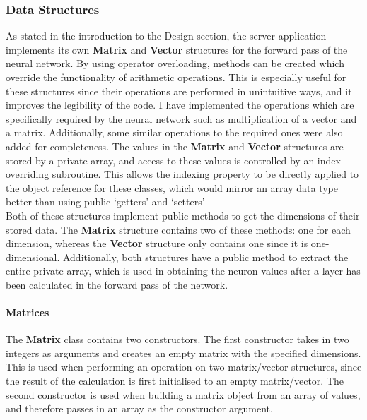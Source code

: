 \documentclass{article}
\begin{document}
\subsubsection{Data Structures}

As stated in the introduction to the Design section, the server application implements its own \textbf{Matrix} and \textbf{Vector} structures for the forward pass of the neural network. By using operator overloading, methods can be created which override the functionality of arithmetic operations. This is especially useful for these structures since their operations are performed in unintuitive ways, and it improves the legibility of the code. I have implemented the operations which are specifically required by the neural network such as multiplication of a vector and a matrix. Additionally, some similar operations to the required ones were also added for completeness. The values in the \textbf{Matrix} and \textbf{Vector} structures are stored by a private array, and access to these values is controlled by an index overriding subroutine. This allows the indexing property to be directly applied to the object reference for these classes, which would mirror an array data type better than using public `getters' and `setters' \\

Both of these structures implement public methods to get the dimensions of their stored data. The \textbf{Matrix} structure contains two of these methods: one for each dimension, whereas the \textbf{Vector} structure only contains one since it is one-dimensional. Additionally, both structures have a public method to extract the entire private array, which is used in obtaining the neuron values after a layer has been calculated in the forward pass of the network.

\paragraph{Matrices\\}

The \textbf{Matrix} class contains two constructors. The first constructor takes in two integers as arguments and creates an empty matrix with the specified dimensions. This is used when performing an operation on two matrix/vector structures, since the result of the calculation is first initialised to an empty matrix/vector. The second constructor is used when building a matrix object from an array of values, and therefore passes in an array as the constructor argument. \\
\end{document}

